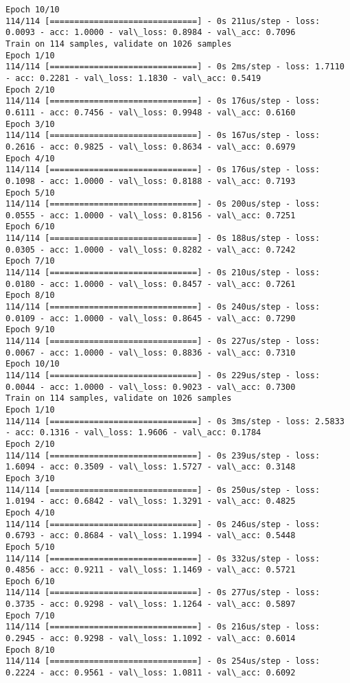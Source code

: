 \documentclass[11pt]{article}
\begin{document}
\begin{Verbatim}[commandchars=\\\{\}]
Epoch 10/10
114/114 [==============================] - 0s 211us/step - loss: 0.0093 - acc: 1.0000 - val\_loss: 0.8984 - val\_acc: 0.7096
Train on 114 samples, validate on 1026 samples
Epoch 1/10
114/114 [==============================] - 0s 2ms/step - loss: 1.7110 - acc: 0.2281 - val\_loss: 1.1830 - val\_acc: 0.5419
Epoch 2/10
114/114 [==============================] - 0s 176us/step - loss: 0.6111 - acc: 0.7456 - val\_loss: 0.9948 - val\_acc: 0.6160
Epoch 3/10
114/114 [==============================] - 0s 167us/step - loss: 0.2616 - acc: 0.9825 - val\_loss: 0.8634 - val\_acc: 0.6979
Epoch 4/10
114/114 [==============================] - 0s 176us/step - loss: 0.1098 - acc: 1.0000 - val\_loss: 0.8188 - val\_acc: 0.7193
Epoch 5/10
114/114 [==============================] - 0s 200us/step - loss: 0.0555 - acc: 1.0000 - val\_loss: 0.8156 - val\_acc: 0.7251
Epoch 6/10
114/114 [==============================] - 0s 188us/step - loss: 0.0305 - acc: 1.0000 - val\_loss: 0.8282 - val\_acc: 0.7242
Epoch 7/10
114/114 [==============================] - 0s 210us/step - loss: 0.0180 - acc: 1.0000 - val\_loss: 0.8457 - val\_acc: 0.7261
Epoch 8/10
114/114 [==============================] - 0s 240us/step - loss: 0.0109 - acc: 1.0000 - val\_loss: 0.8645 - val\_acc: 0.7290
Epoch 9/10
114/114 [==============================] - 0s 227us/step - loss: 0.0067 - acc: 1.0000 - val\_loss: 0.8836 - val\_acc: 0.7310
Epoch 10/10
114/114 [==============================] - 0s 229us/step - loss: 0.0044 - acc: 1.0000 - val\_loss: 0.9023 - val\_acc: 0.7300
Train on 114 samples, validate on 1026 samples
Epoch 1/10
114/114 [==============================] - 0s 3ms/step - loss: 2.5833 - acc: 0.1316 - val\_loss: 1.9606 - val\_acc: 0.1784
Epoch 2/10
114/114 [==============================] - 0s 239us/step - loss: 1.6094 - acc: 0.3509 - val\_loss: 1.5727 - val\_acc: 0.3148
Epoch 3/10
114/114 [==============================] - 0s 250us/step - loss: 1.0194 - acc: 0.6842 - val\_loss: 1.3291 - val\_acc: 0.4825
Epoch 4/10
114/114 [==============================] - 0s 246us/step - loss: 0.6793 - acc: 0.8684 - val\_loss: 1.1994 - val\_acc: 0.5448
Epoch 5/10
114/114 [==============================] - 0s 332us/step - loss: 0.4856 - acc: 0.9211 - val\_loss: 1.1469 - val\_acc: 0.5721
Epoch 6/10
114/114 [==============================] - 0s 277us/step - loss: 0.3735 - acc: 0.9298 - val\_loss: 1.1264 - val\_acc: 0.5897
Epoch 7/10
114/114 [==============================] - 0s 216us/step - loss: 0.2945 - acc: 0.9298 - val\_loss: 1.1092 - val\_acc: 0.6014
Epoch 8/10
114/114 [==============================] - 0s 254us/step - loss: 0.2224 - acc: 0.9561 - val\_loss: 1.0811 - val\_acc: 0.6092

\end{Verbatim}
\end{document}
